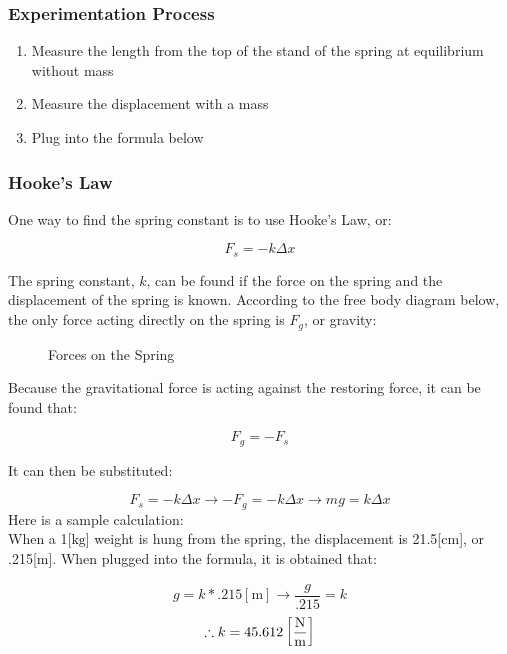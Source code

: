 \documentclass{article}
\begin{document}
\subsubsection{Experimentation Process}

\begin{enumerate}
    
    \item Measure the length from the top of the stand of the spring at equilibrium without mass
    
    \item Measure the displacement with a mass
    
    \item Plug into the formula below
    
\end{enumerate}

\subsubsection{Hooke's Law}
\vspace{10pt}
One way to find the spring constant is to use Hooke's Law, or:


$$F_s = -k\Delta x$$

The spring constant, $k$, can be found if the force on the spring and the displacement of the spring is known. According to the free body diagram below, the only force acting directly on the spring is $F_g$, or gravity:

\begin{figure}[H]
    
    \caption{Forces on the Spring}
\end{figure}

Because the gravitational force is acting against the restoring force, it can be found that:

$$F_g = -F_s$$

It can then be substituted:

$$F_s = -k\Delta x \longrightarrow -F_g = -k\Delta x \longrightarrow mg = k\Delta x$$
\vspace{16pt}
Here is a sample calculation:\\
\vspace{8pt}
When a 1[$\si{\kilo\gram}$] weight is hung from the spring, the displacement is 21.5[$\si{\centi\meter}$], or .215[$\si{\meter}$]. When plugged into the formula, it is obtained that:

$$g = k*.215[\si{\meter}]\longrightarrow\frac{g}{.215} = k$$
$$\therefore k = 45.612\left[\si{\frac{\newton}{\meter}}\right]$$
\end{document}
